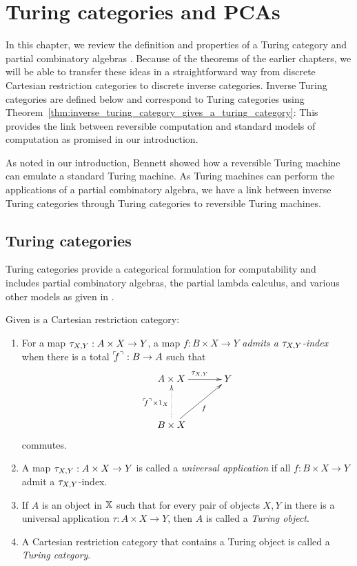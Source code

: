 \chapter{Turing categories and PCAs} %
\label{chap:turing_categories}

In this chapter, we review the definition and properties of a Turing category and partial
combinatory algebras
\cite{cockett-hostra08-intro-to-turing,cockett2010:categories-and-computability}. Because of
the theorems of the earlier chapters, we will be able to transfer these ideas in a straightforward
way from discrete Cartesian restriction categories to discrete inverse categories.  Inverse Turing
categories are defined below and correspond to Turing categories using
Theorem~\ref{thm:inverse_turing_category_gives_a_turing_category}: This  provides the link between
reversible computation and standard models of computation as promised in our introduction.

As noted in our introduction, Bennett\cite{bennett:1973reverse} showed how a reversible Turing
machine can emulate a standard Turing machine. As Turing machines can perform the applications of a
partial combinatory algebra, we have a link between inverse Turing categories through Turing
categories to reversible Turing machines.

\section{Turing categories}
\label{sec:turing_category_definitions}
Turing categories provide a categorical formulation for
computability and includes partial combinatory algebras, the partial lambda calculus, and various
other models as given in
\cite{cockett-hostra08-intro-to-turing}.

\begin{definition}\label{def:turing_category}
  Given \X is a Cartesian restriction category:
  \begin{enumerate}
    \item For a map $\tau_{{X},{Y}}: A \times X \to Y$, a map $f:B\times X \to Y$ \emph{admits a $\tau_{{X},{Y}}$-index}
      when there is a total ${}^\ulcorner\!\!f^\urcorner:B\to A$ such that
      \[
        \xymatrix@C+10pt@R+10pt{
          A\times X \ar[r]^{\txy} & Y \\
          B\times X \ar@{.>}[u]^{\name{f}\times 1_X} \ar[ur]_f
        }
      \]
      commutes.\label{defitem:turing_admit_txy_index}
    \item A map $\tau_{{X},{Y}}: A \times X \to Y$ is called a \emph{universal application} if all
      $f:B\times X \to Y$ admit a $\tau_{{X},{Y}}$-index.\label{defitem:turing_universal_application}
    \item If $A$ is an object in $\mathbb{X}$ such that for every pair of objects $X,Y$ in \X there is
      a universal application $\tau:A\times X \to Y$, then $A$ is called a \emph{Turing object}.
    \item A Cartesian restriction category that contains a Turing object is called a
      \emph{Turing category}.
  \end{enumerate}
\end{definition}

